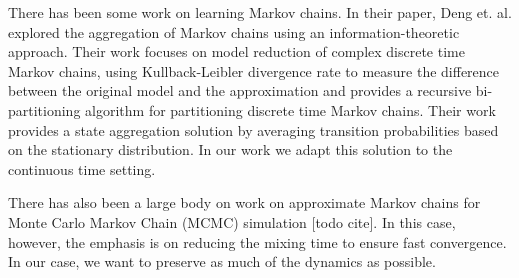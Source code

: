 There has been some work on learning Markov chains. In their paper, Deng et. al. \cite{5746509} explored the aggregation of Markov chains using an information-theoretic
approach. Their work focuses on model reduction of complex discrete time Markov chains, using Kullback-Leibler divergence
rate to measure the difference between the original model and the approximation and provides a recursive bi-partitioning
algorithm for partitioning discrete time Markov chains. Their work provides a state aggregation solution by averaging
transition probabilities based on the stationary distribution. In our work we adapt this solution to the continuous time
setting.

There has also been a large body on work on approximate Markov chains for Monte Carlo Markov Chain (MCMC) simulation [todo cite]. In this case, however, the emphasis is on reducing the mixing time to ensure fast convergence. In our case, we want to preserve as much of the dynamics as possible. 


